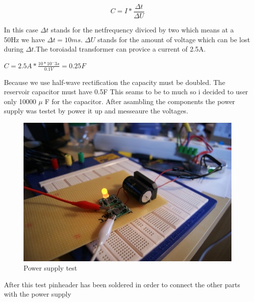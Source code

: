 \begin{equation}
	C=I*\frac{\Delta t}{\Delta U}
	\label{reservoidCapacitor}
\end{equation} 

In this case $\Delta t$ stands for the netfrequency diviced by two which means at a 50Hz we have $\Delta t = 10ms$. $\Delta U$ stands for the amount of voltage which can be lost during $\Delta t$.The toroiadal transformer can provice a current of 2.5A. 
\begin{center}
	$C=2.5A * \frac{10*10^-3s}{0.1V}=0.25F$
\end{center}
Because we use half-wave rectification the capacity must be doubled. The reservoir capacitor must have 0.5F
This seams to be to much so i decided to user only 10000 $\mu$ F for the capacitor. After asambling the components the power supply was testet by power it up and messeaure the voltages.

\begin{figure}[h!]
	\begin{center}
	\includegraphics[scale=0.4]{pictures/powerSupplyTest}
	\caption{Power supply test}	
	\end{center}
\end{figure}

After this test pinheader has been soldered in order to connect the other parts with the power supply

